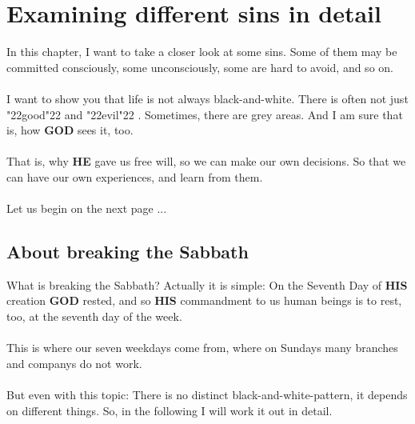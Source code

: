 \documentclass[12pt,a5paper]{article}
\newcommand{\God}[0]{\textbf{GOD}}
\newcommand{\He}[0]{\textbf{HE}}
\newcommand{\His}[0]{\textbf{HIS}}
\newcommand{\q}[1]{\char"22{#1}\char"22 }
\begin{document}
	\newpage
	\section{Examining different sins in detail}
		In this chapter,
		I want to take a closer look at some sins.
		Some of them may be committed consciously,
		some unconsciously,
		some are hard to avoid,
		and so on.
		\\
		\\
		I want to show you that life is not always black-and-white.
		There is often not just \q{good} and \q{evil}.
		Sometimes,
		there are grey areas.
		And I am sure that is,
		how {\God} sees it,
		too.
		\\
		\\
		That is,
		why {\He} gave us free will,
		so we can make our own decisions.
		So that we can have our own experiences,
		and learn from them.
		\\
		\\
		Let us begin on the next page ...

	\newpage
	\subsection{About breaking the Sabbath}
		What is breaking the Sabbath?
		Actually it is simple:
		On the Seventh Day of {\His} creation {\God} rested,
		and so {\His} commandment to us human beings is to rest,
		too,
		at the seventh day of the week.
		\\
		\\
		This is where our seven weekdays come from,
		where on Sundays many branches and companys do not work.
		\\
		\\
		But even with this topic:
		There is no distinct black-and-white-pattern,
		it depends on different things.
		So,
		in the following I will work it out in detail.
	
\end{document}
